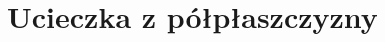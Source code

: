 \documentclass[aspectratio=169]{beamer}
\begin{document}
\begin{frame}
\begin{figure}
  	{\escapeFromCircleConvPlotFixedTex}
\end{figure}
\end{frame}

\begin{frame}
\begin{columns}
\begin{column}{0.25\textwidth}
  \begin{figure}
    	{\escapeFromRectanglePointTex}
  \end{figure}
\end{column}
\begin{column}{0.25\textwidth}
  \begin{figure}
    	{\escapeFromRectangleShiftTex}
  \end{figure}
\end{column}
\begin{column}{0.25\textwidth}
  \begin{figure}
    	{\escapeFromRectangleLogoTex}
  \end{figure}
\end{column}
\begin{column}{0.25\textwidth}
  \begin{figure}
    	{\escapeFromRectangleAzimuthTex}
  \end{figure}
\end{column}
\end{columns}
\end{frame}

\begin{frame}
\begin{figure}
  	{\escapeFromRectangleConvPlotTex}
\end{figure}
\end{frame}

\section{Ucieczka z półpłaszczyzny}

\begin{frame}
  \begin{figure}
    	{\escapeFromHalfplaneTex}
  \end{figure}
\end{frame}
\end{document}
